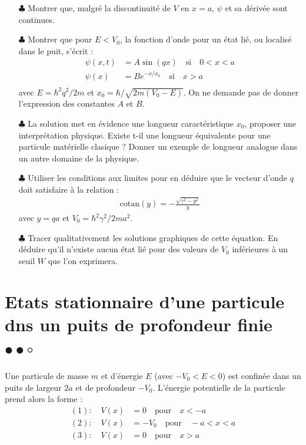 \documentclass{report}
\begin{document}
\begin{itemize}

	\item[$\clubsuit$] Montrer que, malgré la discontinuité de $V$ en $x=a$, $\psi$ et sa dérivée sont continues.
	
	\item[$\clubsuit$] Montrer que pour $E<V_0$, la fonction d'onde pour un état lié, ou localisé dans le puit, s'écrit :
	\begin{align*}
		\psi(x,t)&=A\sin(qx)\quad \mathrm{si}\quad 0<x<a \\
		\psi(x)&=Be^{-x/x_0}\quad \mathrm{si}\quad x>a \\
	\end{align*}
avec $E=\hbar^2q^2/2m$ et $x_0=\hbar/\sqrt{2m(V_0-E)}$. On ne demande pas de donner l'expression des constantes $A$ et $B$.

	\item[$\clubsuit$] La solution met en évidence une longueur caractéristique $x_0$, proposer une interprétation physique. Existe t-il une longueur équivalente pour une particule matérielle clasique ? Donner un exemple de longueur analogue dans un autre domaine de la physique. 
	
	\item[$\clubsuit$] Utiliser les conditions aux limites pour en déduire que le vecteur d'onde $q$ doit satisfaire à la relation :
	\begin{align*}
	 \mathrm{cotan}(y)=-\frac{\sqrt{\gamma^2-y^2}}{y}
	\end{align*}
avec $y=qa$ et $V_0=\hbar^2\gamma^2/2ma^2$.

\item[$\clubsuit$] Tracer qualitativement les solutions graphiques de cette équation. En déduire qu'il n'existe aucun état lié pour des valeurs de $V_0$ inférieures à un seuil $W$ que l'on exprimera. 

\end{itemize}

\newpage

\section*{Etats stationnaire d'une particule dns un puits de profondeur finie $\bullet\bullet\circ$}

Une particule de masse $m$ et d'énergie $E$ (avec $-V_0<E<0$) est confinée dans un puits de largeur $2a$ et de profondeur $-V_0$. L'énergie potentielle de la particule prend alors la forme :
\begin{align*}
	\mathrm{(1) :}\quad V(x)&=0\quad \mathrm{pour}\quad x<-a \\
		\mathrm{(2) :}\quad V(x)&=-V_0\quad \mathrm{pour}\quad -a<x<a \\
		\mathrm{(3) :}\quad V(x)&=0\quad \mathrm{pour}\quad x>a \\
\end{align*}
\end{document}
